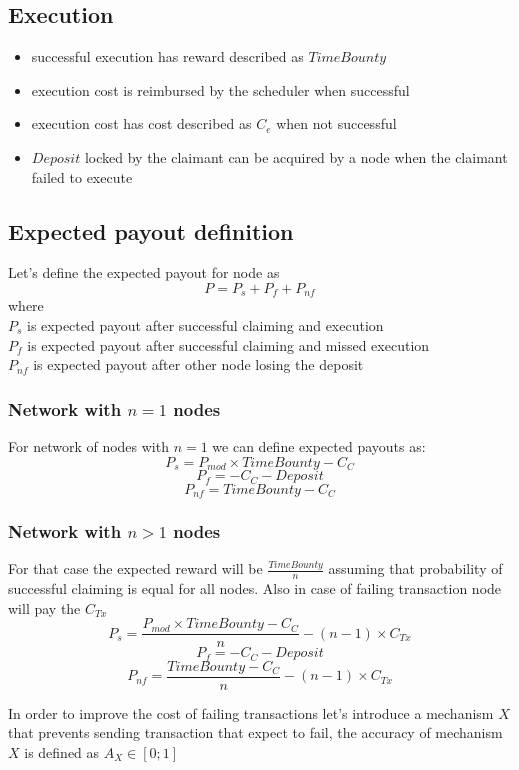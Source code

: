 \documentclass{article}
\begin{document}
\subsection{Execution}
\begin{itemize}
\item successful execution has reward described as $TimeBounty$ 
\item execution cost is reimbursed by the scheduler when successful
\item execution cost has cost described as $C_{e}$ when not successful
\item $Deposit$ locked by the claimant can be acquired by a node when the claimant failed to execute
\end{itemize}

\subsection{Expected payout definition}
Let's define the expected payout for node as
\[
P=P_{s}+P_{f}+P_{nf}
\]
where
\\

$P_{s}$ is expected payout after successful claiming and execution
\\

$P_{f}$ is expected payout after successful claiming and missed execution
\\

$P_{nf}$ is expected payout after other node losing the deposit
\\

\subsubsection{Network with $n=1$ nodes}
For network of nodes with $n=1$ we can define expected payouts as:
\[
P_{s}=P_{mod} \times TimeBounty-C_{C} 
\]
\[
P_{f}=-C_{C}-Deposit
\]
\[
P_{nf}=TimeBounty-C_{C}
\]
\subsubsection{Network with $n>1$ nodes}
For that case the expected reward will be $\frac{TimeBounty}{n}$ assuming that probability of successful claiming is equal for all nodes. Also in case of failing transaction node will pay the $C_{Tx}$
\[
P_{s}=\frac{P_{mod} \times TimeBounty-C_{C}}{n} - (n-1) \times C_{Tx}
\]
\[
P_{f}=-C_{C}-Deposit
\]
\[
P_{nf}=\frac{TimeBounty-C_{C}}{n} - (n-1) \times C_{Tx}
\]

In order to improve the cost of failing transactions let's introduce a mechanism $X$ that prevents sending transaction that expect to fail, the accuracy of mechanism $X$ is defined as $A_{X} \in [0;1]$
\end{document}
